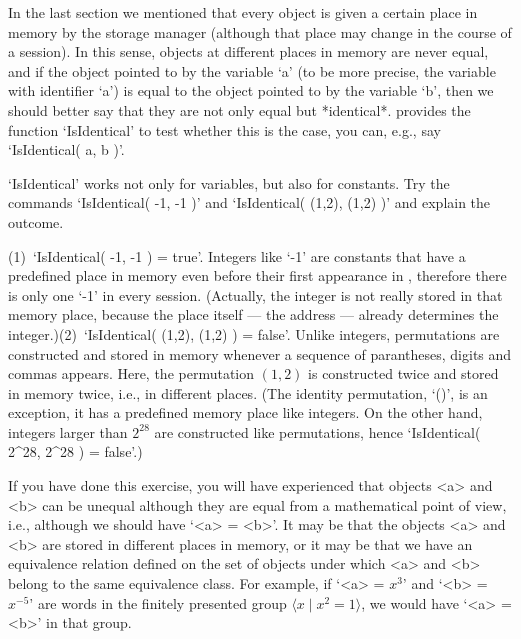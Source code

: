 \null

%
In the last section  we mentioned that every object   is given a  certain
place  in memory by the  {\GAP} storage manager  (although that place may
change in the course  of  a {\GAP}  session). In  this sense, objects  at
different places in memory are never equal, and if  the object pointed to
by the  variable  `a' (to be more  precise,  the variable with identifier
`a')  is  equal to the   object pointed to by  the  variable `b', then we
should better  say that they  are not only  equal but *identical*. {\GAP}
provides the function `IsIdentical' to test whether this is the case, you
can, e.g., say `IsIdentical( a, b )'.

%
\exercise  `IsIdentical'   works not only  for   variables,  but also for
constants. Try  the commands  `IsIdentical(  -1, -1 )'  and `IsIdentical(
(1,2), (1,2) )' and explain the outcome.

\answer  (1)~`IsIdentical( -1,  -1  )  =  true'.  Integers  like `-1' are
constants that have a predefined place in memory  even before their first
appearance  in {\GAP}, therefore there  is only one  `-1' in every {\GAP}
session.  (Actually,   the integer is  not  really stored in  that memory
place, because  the place itself --- the  address ---  already determines
the  integer.)\quad(2)~`IsIdentical(  (1,2),  (1,2) )   =  false'. Unlike
integers, permutations are constructed and   stored in memory whenever  a
sequence of    parantheses,    digits and  commas   appears.   Here,  the
permutation $(1,2)$  is constructed  twice  and stored  in  memory twice,
i.e.,  in different   places.  (The  identity  permutation,  `()', is  an
exception, it has a  predefined memory place like  integers. On the other
hand,  integers larger than  $2^{28}$  are constructed like permutations,
hence `IsIdentical( 2^28, 2^28 ) = false'.)

If  you have done this  exercise, you  will  have experienced that {\GAP}
objects  <a>  and  <b> can  be  unequal  although they are   equal from a
mathematical point of view, i.e., although we should have `<a> = <b>'. It
may  be that the objects <a>  and <b> are  stored  in different places in
memory, or it may be that we have  an equivalence relation defined on the
set of  objects under which <a>  and <b> belong   to the same equivalence
class.  For example, if `<a>  = $x^3$' and  `<b> = $x^{-5}$' are words in
the finitely presented group $\langle  x\mid x^2=1\rangle$, we would have
`<a> = <b>' in that group.

